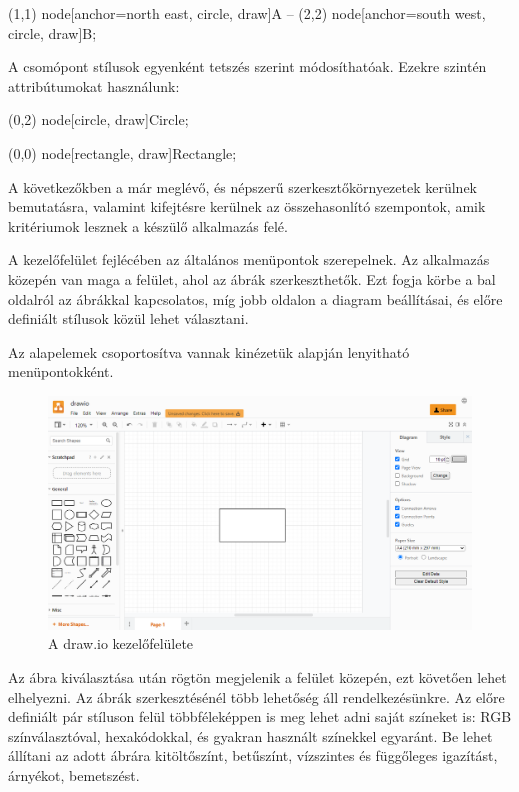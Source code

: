 \begin{tikzcode}
\draw 
(1,1) node[anchor=north east, circle, draw]{A} 
	-- 
(2,2) node[anchor=south west, circle, draw]{B}; 
\end{tikzcode}

A csomópont stílusok egyenként tetszés szerint módosíthatóak. Ezekre szintén attribútumokat használunk:

\begin{tikzcode}
\draw (0,2) node[circle, draw]{Circle};



\draw (0,0) node[rectangle, draw]{Rectangle}; 
\end{tikzcode}



A következőkben a már meglévő, és népszerű szerkesztőkörnyezetek kerülnek bemutatásra, valamint kifejtésre kerülnek az összehasonlító szempontok, amik kritériumok lesznek a készülő alkalmazás felé.


A kezelőfelület fejlécében az általános menüpontok szerepelnek. Az alkalmazás közepén van maga a felület, ahol az ábrák szerkeszthetők. Ezt fogja körbe a bal oldalról az ábrákkal kapcsolatos, míg jobb oldalon a diagram beállításai, és előre definiált stílusok közül lehet választani. 

Az alapelemek csoportosítva vannak kinézetük alapján lenyitható menüpontokként. 

\begin{figure}[!h]
	\includegraphics[width=\textwidth]{images/drawio.png}
	\caption{A draw.io kezelőfelülete \cite{drawio}}
	\label{fig:drawio}
\end{figure}

Az ábra kiválasztása után rögtön megjelenik a felület közepén, ezt követően lehet elhelyezni. Az ábrák szerkesztésénél több lehetőség áll rendelkezésünkre. Az előre definiált pár stíluson felül többféleképpen is meg lehet adni saját színeket is: RGB színválasztóval, hexakódokkal, és gyakran használt színekkel egyaránt. Be lehet állítani az adott ábrára kitöltőszínt, betűszínt, vízszintes és függőleges igazítást, árnyékot, bemetszést.

